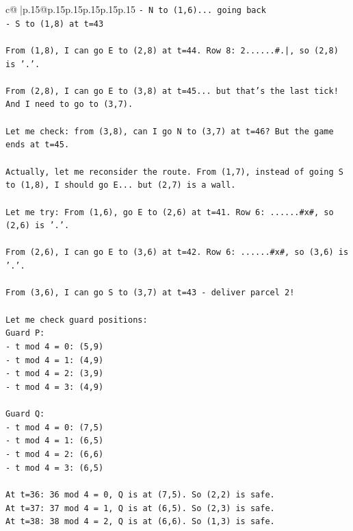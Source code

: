 \documentclass{article}
\begin{document}
{\begin{supertabular}{c@{$\;$}|p{.15\linewidth}@{}p{.15\linewidth}p{.15\linewidth}p{.15\linewidth}p{.15\linewidth}p{.15\linewidth}}
{{{\texttt{{-} N to (1,6)... going back} \\
\texttt{{-} S to (1,8) at t=43} \\
\\ 
\texttt{From (1,8), I can go E to (2,8) at t=44. Row 8: 2......\#.|, so (2,8) is '.'.} \\
\\ 
\texttt{From (2,8), I can go E to (3,8) at t=45... but that's the last tick! And I need to go to (3,7).} \\
\\ 
\texttt{Let me check: from (3,8), can I go N to (3,7) at t=46? But the game ends at t=45.} \\
\\ 
\texttt{Actually, let me reconsider the route. From (1,7), instead of going S to (1,8), I should go E... but (2,7) is a wall.} \\
\\ 
\texttt{Let me try: From (1,6), go E to (2,6) at t=41. Row 6: ......\#x\#, so (2,6) is '.'.} \\
\\ 
\texttt{From (2,6), I can go E to (3,6) at t=42. Row 6: ......\#x\#, so (3,6) is '.'.} \\
\\ 
\texttt{From (3,6), I can go S to (3,7) at t=43 {-} deliver parcel 2!} \\
\\ 
\texttt{Let me check guard positions:} \\
\texttt{Guard P:} \\
\texttt{{-} t mod 4 = 0: (5,9)} \\
\texttt{{-} t mod 4 = 1: (4,9)} \\
\texttt{{-} t mod 4 = 2: (3,9)} \\
\texttt{{-} t mod 4 = 3: (4,9)} \\
\\ 
\texttt{Guard Q:} \\
\texttt{{-} t mod 4 = 0: (7,5)} \\
\texttt{{-} t mod 4 = 1: (6,5)} \\
\texttt{{-} t mod 4 = 2: (6,6)} \\
\texttt{{-} t mod 4 = 3: (6,5)} \\
\\ 
\texttt{At t=36: 36 mod 4 = 0, Q is at (7,5). So (2,2) is safe.} \\
\texttt{At t=37: 37 mod 4 = 1, Q is at (6,5). So (2,3) is safe.} \\
\texttt{At t=38: 38 mod 4 = 2, Q is at (6,6). So (1,3) is safe.} \\
}}}
\end{supertabular}}
\end{document}
